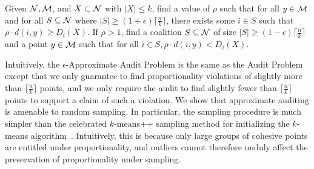 

\iffalse

\begin{definition}
\label{def:approx-audit}
	Given $\mathcal {N}, \mathcal{M}$, and $X \subset \mathcal {N}$ with $|X| \leq k$, find a value of $\rho$ such that for all $y \in \mathcal{M}$ and for all $S \subseteq \mathcal {N}$ where $|S| \geq (1+\epsilon) \lceil \frac{n}{k} \rceil$, there exists some $i \in S$ such that $\rho \cdot d(i, y) \geq D_i(X)$. If $\rho > 1$, find a coalition $S \subseteq \mathcal {N}$ of size $|S| \geq (1-\epsilon) \lceil \frac{n}{k} \rceil$ and a point $y \in \mathcal{M}$ such that for all $i \in S, \rho \cdot d(i, y) < D_i(X)$.
\end{definition} 

Intuitively, the $\epsilon$-Approximate Audit Problem is the same as the Audit Problem except that we only guarantee to find proportionality violations of slightly more than $\lceil \frac{n}{k} \rceil$ points, and we only require the audit to find slightly fewer than $\lceil \frac{n}{k} \rceil$ points to support a claim of such a violation. We show that approximate auditing is amenable to random sampling. In particular, the sampling procedure is much simpler than the celebrated $k$-means++ sampling method for initializing the $k$-means algorithm~\cite{kmeans++}. Intuitively, this is because only large groups of cohesive points are entitled under proportionality, and outliers cannot therefore unduly affect the preservation of proportionality under sampling.


